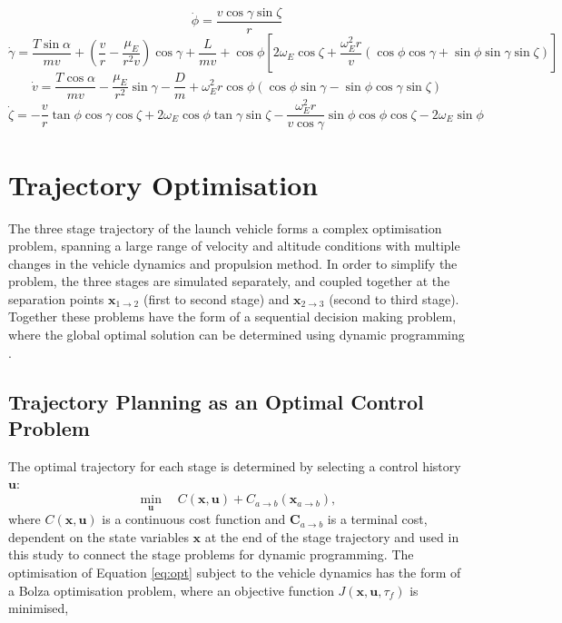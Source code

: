 \documentclass[]{aiaa-tc}
\begin{document}
\begin{equation}
\dot{\phi} = \frac{v\cos\gamma\sin\zeta}{r}
\end{equation}
\begin{equation}
\dot{\gamma} = \frac{T\sin\alpha}{mv}+ (\frac{v}{r}-\frac{\mu_E}{r^2 v})\cos\gamma + \frac{L}{mv}
 + \cos\phi[2\omega_E \cos\zeta + \frac{\omega_E^2 r}{v}(\cos\phi\cos\gamma+\sin\phi\sin\gamma\sin\zeta)]
 \end{equation}
\begin{equation}
\dot{v} = \frac{T\cos\alpha}{mv}-\frac{\mu_E}{r^2}\sin\gamma - \frac{D}{m}
+ \omega_E^2 r\cos\phi(\cos\phi\sin\gamma-\sin\phi\cos\gamma\sin\zeta)
\end{equation}
\begin{equation}
\dot{\zeta} = -\frac{v}{r}\tan\phi\cos\gamma\cos\zeta +2\omega_E\cos\phi\tan\gamma\sin\zeta - \frac{\omega_E^2 r}{v\cos\gamma}\sin\phi\cos\phi\cos\zeta-2\omega_E\sin\phi 
\end{equation}


\section{Trajectory Optimisation} \label{section:optimisation}

The three stage trajectory of the launch vehicle forms a complex optimisation problem, spanning a large range of velocity and altitude conditions with multiple changes in the vehicle dynamics and propulsion method. In order to simplify the problem, the three stages are simulated separately, and coupled together at the separation points $\textbf{x}_{1 \rightarrow 2}$ (first to second stage) and  $\textbf{x}_{2 \rightarrow 3}$ (second to third stage). Together these problems have the form of a sequential decision making problem, where the global optimal solution can be determined using dynamic programming \cite{Bertsekas2005}. 




\subsection{Trajectory Planning as an Optimal Control Problem}

 The optimal trajectory for each stage is determined by selecting a control history $\textbf{u}$:
\begin{equation} \label{eq:opt}
\min\limits_{\textbf{u}} \quad C(\textbf{x},\textbf{u}) + C_{a\rightarrow  b}(\textbf{x}_{a\rightarrow b}),
\end{equation}
where $C(\textbf{x},\textbf{u})$ is a continuous cost function and $\textbf{C}_{{a\rightarrow b}}$ is a terminal cost, dependent on the state variables $\textbf{x}$ at the end of the stage trajectory and used in this study to connect the stage problems for dynamic programming.
The optimisation of Equation \ref{eq:opt} subject to the vehicle dynamics has the form of a Bolza optimisation problem, where an objective function $J(\textbf{x},\textbf{u},\tau_f)$ is minimised,
\end{document}
